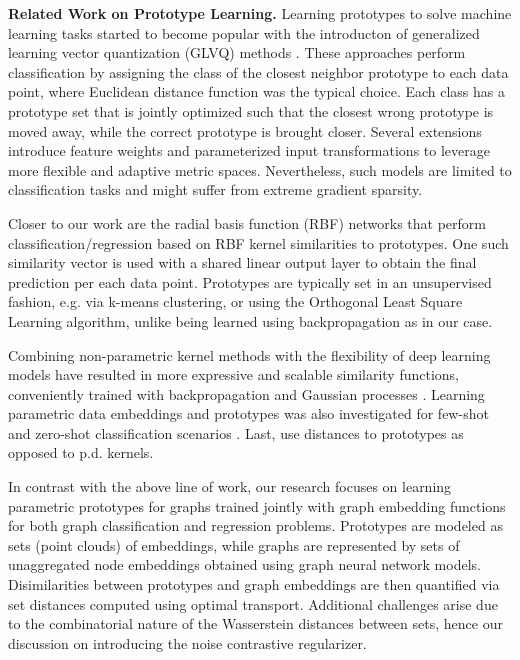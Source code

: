 \documentclass[letterpaper]{article} \usepackage{aaai22}  \usepackage{times}  \usepackage{helvet}  \usepackage{courier}  \usepackage[hyphens]{url}  \usepackage{graphicx} \urlstyle{rm} \def\UrlFont{\rm}  \usepackage{natbib}  \usepackage{caption} \DeclareCaptionStyle{ruled}{labelfont=normalfont,labelsep=colon,strut=off} \frenchspacing  \setlength{\pdfpagewidth}{8.5in}  \setlength{\pdfpageheight}{11in}  \usepackage{algorithm}
\begin{document}
\textbf{Related Work on Prototype Learning.}  Learning prototypes to solve machine learning tasks started to become popular with the introducton of generalized learning vector quantization (GLVQ) methods \citep{kohonen1995learning,sato1995generalized}. These approaches perform classification by assigning the class of the closest neighbor prototype to each data point, where Euclidean distance function was the typical choice. Each class has a prototype set that is jointly optimized such that the closest wrong prototype is moved away, while the correct prototype is brought closer. Several extensions  \citep{hammer2002generalized,schneider2009adaptive,bunte2012limited} introduce feature weights and parameterized input transformations to leverage more flexible and adaptive metric spaces. Nevertheless, such models are limited to classification tasks and might suffer from extreme gradient sparsity.

Closer to our work are the radial basis function (RBF) networks \citep{chen1991orthogonal} that perform classification/regression based on RBF kernel similarities to prototypes. One such similarity vector is used  with a shared linear output layer to obtain the final prediction per each data point. Prototypes are typically set in an unsupervised fashion, e.g. via k-means clustering, or using the Orthogonal Least Square Learning algorithm, unlike being learned using backpropagation as in our case.

Combining non-parametric kernel methods with the flexibility of deep learning models have resulted in more expressive and scalable similarity functions, conveniently trained with backpropagation and Gaussian processes \citep{wilson2016deep}. Learning parametric data embeddings and prototypes was also investigated for few-shot and zero-shot classification scenarios \citep{snell2017prototypical}. Last, \citet{duin2012dissimilarity} use distances to prototypes as opposed to p.d. kernels. 

In contrast with the above line of work, our research focuses on learning parametric prototypes for graphs trained jointly with graph embedding functions for both graph classification and regression problems. Prototypes are modeled as sets (point clouds) of embeddings, while graphs are represented by sets of unaggregated node embeddings obtained using graph neural network models. Disimilarities between prototypes and graph embeddings are then quantified via set distances computed using optimal transport. Additional challenges arise due to the combinatorial nature of the  Wasserstein distances between sets, hence our discussion on introducing the noise contrastive regularizer.
\end{document}
